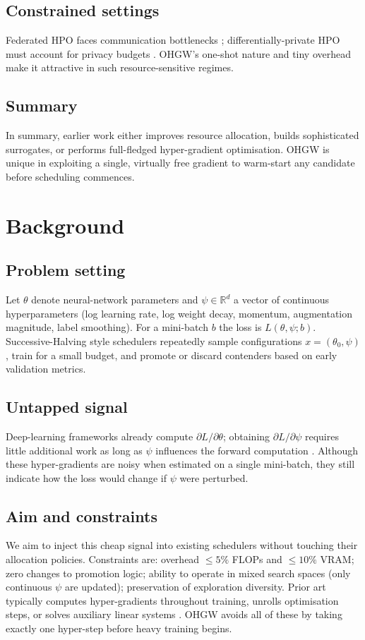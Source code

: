 \documentclass{article}
\begin{document}
\subsection{Constrained settings}
Federated HPO faces communication bottlenecks \cite{khodak-2021-federated}; differentially-private HPO must account for privacy budgets \cite{panda-2022-new,wang-2023-hypo}. OHGW's one-shot nature and tiny overhead make it attractive in such resource-sensitive regimes.

\subsection{Summary}
In summary, earlier work either improves resource allocation, builds sophisticated surrogates, or performs full-fledged hyper-gradient optimisation. OHGW is unique in exploiting a single, virtually free gradient to warm-start any candidate before scheduling commences.

\section{Background}
\subsection{Problem setting}
Let $\theta$ denote neural-network parameters and $\psi \in \mathbb{R}^d$ a vector of continuous hyperparameters (log learning rate, log weight decay, momentum, augmentation magnitude, label smoothing). For a mini-batch $b$ the loss is $L(\theta, \psi; b)$. Successive-Halving style schedulers repeatedly sample configurations $x=(\theta_0, \psi)$, train for a small budget, and promote or discard contenders based on early validation metrics.

\subsection{Untapped signal}
Deep-learning frameworks already compute $\partial L/\partial \theta$; obtaining $\partial L/\partial \psi$ requires little additional work as long as $\psi$ influences the forward computation \cite{chandra-2019-gradient}. Although these hyper-gradients are noisy when estimated on a single mini-batch, they still indicate how the loss would change if $\psi$ were perturbed.

\subsection{Aim and constraints}
We aim to inject this cheap signal into existing schedulers without touching their allocation policies. Constraints are: overhead $\le 5\%$ FLOPs and $\le 10\%$ VRAM; zero changes to promotion logic; ability to operate in mixed search spaces (only continuous $\psi$ are updated); preservation of exploration diversity. Prior art typically computes hyper-gradients throughout training, unrolls optimisation steps, or solves auxiliary linear systems \cite{bertrand-2020-implicit,immer-2023-stochastic}. OHGW avoids all of these by taking exactly one hyper-step before heavy training begins.
\end{document}
